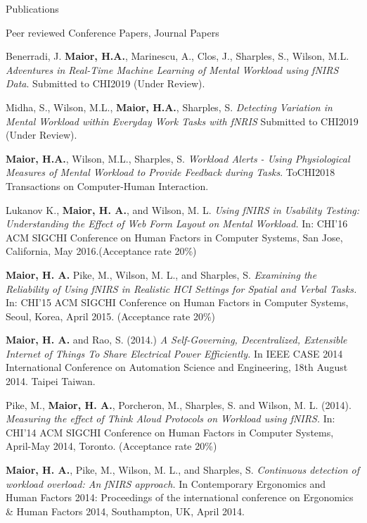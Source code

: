 \documentclass{resume} %
\begin{document}
\begin{rSection}{Publications}
\begin{rSubsection}{ }{ }{ }{Peer reviewed Conference Papers, Journal Papers}

\item Benerradi, J. \textbf{Maior, H.A.}, Marinescu, A., Clos, J., Sharples, S., Wilson, M.L. \emph{Adventures in Real-Time Machine Learning of Mental Workload using fNIRS Data}.  Submitted to CHI2019 (Under Review).
\item Midha, S., Wilson, M.L., \textbf{Maior, H.A.}, Sharples, S. \emph{Detecting Variation in Mental Workload within Everyday Work Tasks with fNRIS}  Submitted to CHI2019 (Under Review).
\item \textbf{Maior, H.A.}, Wilson, M.L., Sharples, S. \emph{Workload Alerts - Using Physiological Measures of Mental Workload to Provide Feedback during Tasks}.  ToCHI2018 Transactions on Computer-Human Interaction.
\item Lukanov K., \textbf{Maior, H. A.}, and Wilson, M. L. \emph{Using fNIRS in Usability Testing: Understanding the Effect of Web Form Layout on Mental Workload.} In: CHI'16 ACM SIGCHI Conference on Human Factors in Computer Systems, San Jose, California, May 2016.(Acceptance rate 20\%)
\item \textbf{Maior, H. A.} Pike, M., Wilson, M. L., and Sharples, S. \emph{Examining the Reliability of Using fNIRS in Realistic HCI Settings for Spatial and Verbal Tasks.} In: CHI'15 ACM SIGCHI Conference on Human Factors in Computer Systems, Seoul, Korea, April 2015. (Acceptance rate 20\%)
\item \textbf{Maior, H. A.} and Rao, S. (2014.) \emph{A Self-Governing, Decentralized, Extensible Internet of Things To Share Electrical Power Efficiently.} In IEEE CASE 2014 International Conference on Automation Science and Engineering, 18th August 2014. Taipei Taiwan.
\item Pike, M., \textbf{Maior, H. A.}, Porcheron, M., Sharples, S. and Wilson, M. L. (2014). \emph{Measuring the effect of Think Aloud Protocols on Workload using fNIRS.} In: CHI'14 ACM SIGCHI Conference on Human Factors in Computer Systems, April-May 2014, Toronto. (Acceptance rate 20\%)
\item \textbf{Maior, H. A.}, Pike, M., Wilson, M. L., and Sharples, S. \emph{Continuous detection of workload overload: An fNIRS approach.} In Contemporary Ergonomics and Human Factors 2014: Proceedings of the international conference on Ergonomics \& Human Factors 2014, Southampton, UK, April 2014.
\end{rSubsection}


\end{rSection}
\end{document}
